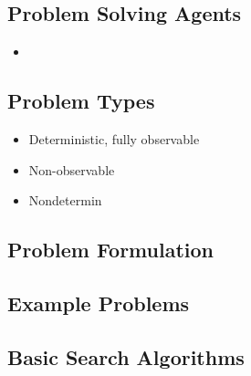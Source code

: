 \subsection*{Problem Solving Agents}
\begin{itemize}
\item
\end{itemize}

\subsection*{Problem Types}
\begin{itemize}
\item Deterministic, fully observable
\item Non-observable
\item Nondetermin
\end{itemize}
\subsection*{Problem Formulation}
\subsection*{Example Problems}
\subsection*{Basic Search Algorithms}